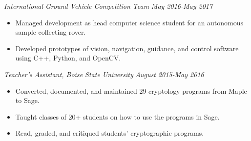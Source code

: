 \documentclass[letterpaper]{article}
\begin{document}
\vspace{.05in}

\begin{multicols}{2}
\textit{International Ground Vehicle Competition Team}
\vfill
\columnbreak
\textit{May 2016-May 2017}
\end{multicols}
\begin{itemize}
    \item Managed development as head computer science student for an autonomous sample collecting rover.
    \item Developed prototypes of vision, navigation, guidance, and control software using C++, Python, and OpenCV. 
\end{itemize}

\vspace{.05in}
\begin{multicols}{2}
\textit{ Teacher's Assistant, Boise State University}
\vfill
\columnbreak
\textit{August 2015-May 2016}
\end{multicols}
\begin{itemize}
    \item Converted, documented, and maintained 29 cryptology programs from Maple to Sage.
    \item Taught classes of 20+ students on how to use the programs in Sage.
    \item Read, graded, and critiqued students' cryptographic programs.
\end{itemize}
\end{document}
